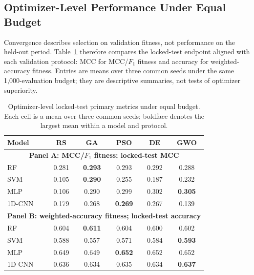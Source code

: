 \FloatBarrier

\subsection{Optimizer-Level Performance Under Equal Budget}

Convergence describes selection on validation fitness, not performance on the held-out period. Table~\ref{tab:optimizer_primary_metrics} therefore compares the locked-test endpoint aligned with each validation protocol: MCC for MCC/$F_1$ fitness and accuracy for weighted-accuracy fitness. Entries are means over three common seeds under the same 1,000-evaluation budget; they are descriptive summaries, not tests of optimizer superiority.

\begin{table}[htbp]
\centering
\caption{Optimizer-level locked-test primary metrics under equal budget. Each cell is a mean over three common seeds; boldface denotes the largest mean within a model and protocol.}
\label{tab:optimizer_primary_metrics}
\manuscripttablestyle
\begin{tabular}{lccccc}\toprule
\textbf{Model} & \textbf{RS} & \textbf{GA} & \textbf{PSO} & \textbf{DE} & \textbf{GWO}\\\midrule
\multicolumn{6}{c}{\textbf{Panel A: MCC/$F_1$ fitness; locked-test MCC}}\\\midrule
RF & 0.281 & \textbf{0.293} & 0.293 & 0.292 & 0.288\\
SVM & 0.105 & \textbf{0.290} & 0.255 & 0.187 & 0.232\\
MLP & 0.106 & 0.290 & 0.299 & 0.302 & \textbf{0.305}\\
1D-CNN & 0.179 & 0.268 & \textbf{0.269} & 0.267 & 0.139\\\midrule
\multicolumn{6}{c}{\textbf{Panel B: weighted-accuracy fitness; locked-test accuracy}}\\\midrule
RF & 0.604 & \textbf{0.611} & 0.604 & 0.600 & 0.602\\
SVM & 0.588 & 0.557 & 0.571 & 0.584 & \textbf{0.593}\\
MLP & 0.649 & 0.649 & \textbf{0.652} & 0.652 & 0.652\\
1D-CNN & 0.636 & 0.634 & 0.635 & 0.634 & \textbf{0.637}\\\bottomrule
\end{tabular}
\end{table}

